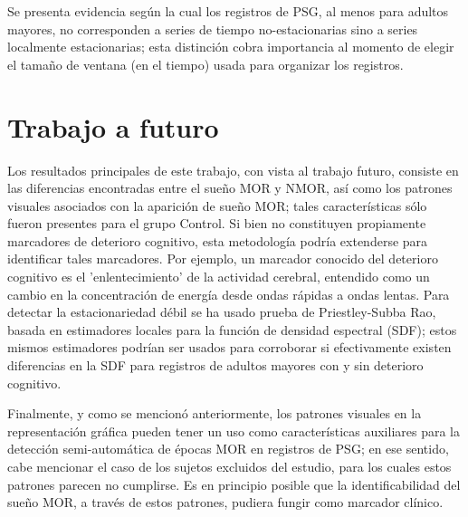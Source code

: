 \documentclass[12pt,a4paper]{mitthesis}
\begin{document}
Se presenta evidencia seg\'un la cual los registros de PSG, al menos para adultos mayores, no 
corresponden a series de tiempo no-estacionarias sino a series localmente estacionarias; esta 
distinci\'on cobra importancia al momento de elegir el tama\~no de ventana (en el tiempo) usada 
para organizar los registros.


\section{Trabajo a futuro}

Los resultados principales de este trabajo, con vista al trabajo futuro, consiste en las 
diferencias encontradas entre el sue\~no MOR y NMOR, as\'i como los patrones visuales asociados con 
la aparici\'on de sue\~no MOR; tales caracter\'isticas s\'olo fueron presentes para el grupo 
Control. Si bien no constituyen propiamente marcadores de deterioro cognitivo, esta metodolog\'ia
podr\'ia extenderse para identificar tales marcadores.
Por ejemplo, un marcador conocido \cite{Becerra12} del deterioro cognitivo es el 'enlentecimiento' 
de la actividad cerebral, entendido como un cambio en la concentraci\'on de energ\'ia desde ondas 
r\'apidas a ondas lentas.
Para detectar la estacionariedad d\'ebil se ha usado prueba de Priestley-Subba Rao, basada en 
estimadores locales para la funci\'on de densidad espectral (SDF); estos mismos estimadores 
podr\'ian ser usados para corroborar si efectivamente existen diferencias en la SDF para registros 
de adultos mayores con y sin deterioro cognitivo. 

Finalmente, y como se mencion\'o anteriormente, los patrones visuales en la representaci\'on 
gr\'afica pueden tener un uso como caracter\'isticas auxiliares para la detecci\'on 
semi-autom\'atica de \'epocas MOR en registros de PSG; en ese sentido, cabe mencionar el caso de 
los sujetos excluidos del estudio, para los cuales estos patrones parecen no cumplirse. 
Es en principio posible que la identificabilidad del sue\~no MOR, a trav\'es de estos patrones, 
pudiera fungir como marcador cl\'inico.

\end{document}
